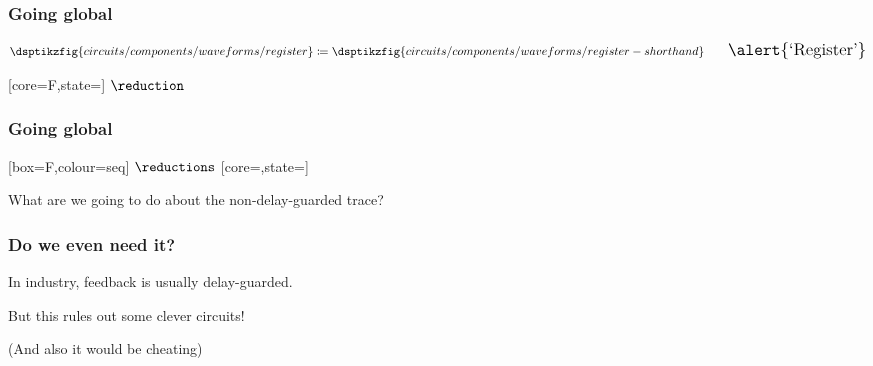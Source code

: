 \begin{frame}
    \frametitle{Going global}

    \centering
    \Large

    \pause

    \normalsize
    \begin{gather*}
        \dsptikzfig{circuits/components/waveforms/register}
        \coloneqq
        \dsptikzfig{circuits/components/waveforms/register-shorthand}
        \qquad
        \Large
        \text{\alert{`Register'}}
    \end{gather*}

    \vspace{1em}

    \pause

    [core=F,state=]
    \Large\(\reduction\)\normalsize

\end{frame}
\begin{frame}
    \frametitle{Going global}

    \centering

    [box=F,colour=seq]
    \Large\(\reductions\)\normalsize
    [core=,state=]

    \pause
    \vspace{1em}

    \Large
    What are we going to do about the non-delay-guarded trace?

\end{frame}
\begin{frame}
    \frametitle{Do we even need it?}

    \centering

    \LARGE

    In industry, feedback is usually \alert{delay-guarded}.

    \pause

    But this rules out some \alert{clever} circuits!

    \normalsize

    \vspace{1em}


    \pause

    \vspace{1em}

    \scriptsize
    (And also it would be cheating)

\end{frame}
